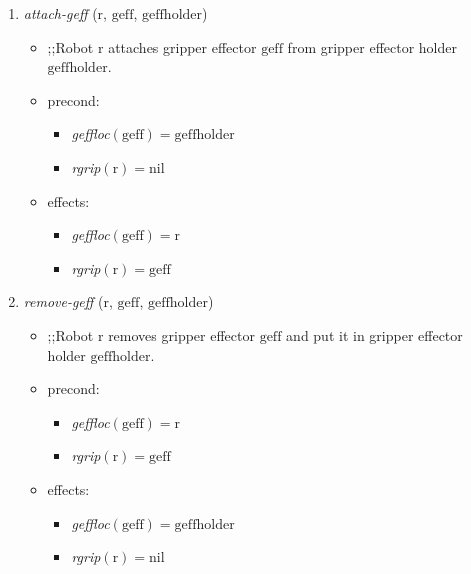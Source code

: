 \begin{small}
\begin{enumerate}
\item \textsl{attach-geff} ($\mathrm{r}$, $\mathrm{geff}$, $\mathrm{geffholder}$)
\begin{itemize}
\item ;;Robot $\mathrm{r}$ attaches gripper effector $\mathrm{geff}$ from gripper effector holder $\mathrm{geffholder}$.
\item precond:
\begin{itemize}
\item[]\emph{geffloc}$\mathrm{(geff)=geffholder}$
\item[]\emph{rgrip}$\mathrm{(r)=nil}$
\end{itemize}
\item effects:
\begin{itemize}
\item[]\emph{geffloc}$\mathrm{(geff)=r}$
\item[]\emph{rgrip}$\mathrm{(r)=geff}$
\end{itemize}
\end{itemize}

\item \textsl{remove-geff} ($\mathrm{r}$, $\mathrm{geff}$, $\mathrm{geffholder}$)
\begin{itemize}
\item ;;Robot $\mathrm{r}$ removes gripper effector $\mathrm{geff}$ and put it in gripper effector holder $\mathrm{geffholder}$.
\item precond:
\begin{itemize}
\item[]\emph{geffloc}$\mathrm{(geff)=r}$
\item[]\emph{rgrip}$\mathrm{(r)=geff}$
\end{itemize}
\item effects:
\begin{itemize}
\item[]\emph{geffloc}$\mathrm{(geff)=geffholder}$
\item[]\emph{rgrip}$\mathrm{(r)=nil}$
\end{itemize}
\end{itemize}
\end{enumerate}
\end{small}


